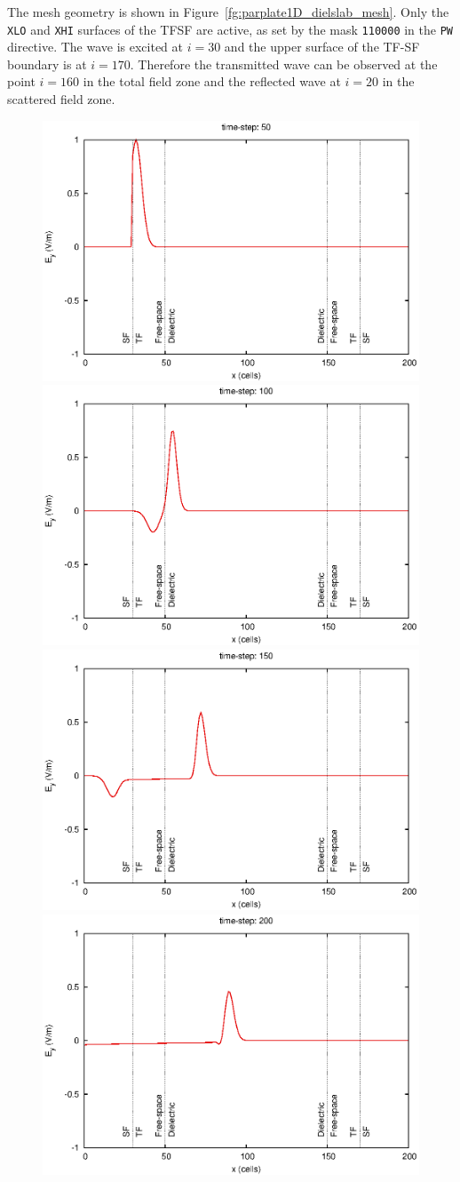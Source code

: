\documentclass[onecolumn,a4paper]{article}
\numberwithin{equation}{section}
\begin{document}
The mesh geometry is shown in Figure~\ref{fg:parplate1D_dielslab_mesh}. Only the \texttt{XLO} and \texttt{XHI} 
surfaces of the TFSF are active, as set by the mask \texttt{110000} in the \texttt{PW} directive. 
The wave is excited at $i=30$ and the upper surface of the TF-SF boundary is at $i=170$.  
Therefore the transmitted wave can be observed at the point $i=160$ in the total field zone 
and the reflected wave at $i=20$ in the scattered field zone. 

\begin{figure}[ht!]
\begin{center}
  \includegraphics[width=0.49\linewidth]{figures/parplate1D_dielslab-frame000050}
  \includegraphics[width=0.49\linewidth]{figures/parplate1D_dielslab-frame000100}
  \includegraphics[width=0.49\linewidth]{figures/parplate1D_dielslab-frame000150}
  \includegraphics[width=0.49\linewidth]{figures/parplate1D_dielslab-frame000200}

\end{center}
\end{figure}
\end{document}
